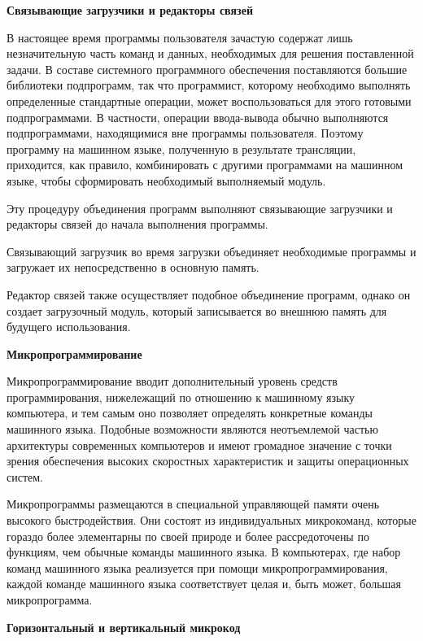 \begin{center}{\bfseries Связывающие загрузчики и редакторы связей}
\end{center}

В настоящее время программы пользователя зачастую содержат лишь незначительную часть команд и данных, необходимых для решения поставленной задачи. В составе системного программного обеспечения поставляются большие библиотеки подпрограмм, так что программист, которому необходимо выполнять определенные стандартные операции, может воспользоваться для этого готовыми подпрограммами. В частности, операции ввода-вывода обычно выполняются подпрограммами, находящимися вне программы пользователя. Поэтому программу на машинном языке, полученную в результате трансляции, приходится, как правило, комбинировать с другими программами на машинном языке, чтобы сформировать необходимый выполняемый модуль.

Эту процедуру объединения программ выполняют связывающие загрузчики и редакторы связей до начала выполнения программы.

Связывающий загрузчик во время загрузки объединяет необходимые программы и загружает их непосредственно в основную память.

Редактор связей также осуществляет подобное объединение программ, однако он создает загрузочный модуль, который записывается во внешнюю память для будущего использования.

\begin{center}{\bfseries Микропрограммирование}
\end{center} 

Микропрограммирование вводит дополнительный уровень средств программирования, нижележащий по отношению к машинному языку компьютера, и тем самым оно позволяет определять конкретные команды машинного языка. Подобные возможности являются неотъемлемой частью архитектуры современных компьютеров и имеют громадное значение с точки зрения обеспечения высоких скоростных характеристик и защиты операционных систем.

Микропрограммы размещаются в специальной управляющей памяти очень высокого быстродействия. Они состоят из индивидуальных микрокоманд, которые гораздо более элементарны по своей природе и более рассредоточены по функциям, чем обычные команды машинного языка. В компьютерах, где набор команд машинного языка реализуется при помощи микропрограммирования, каждой команде машинного языка соответствует целая и, быть может, большая микропрограмма.

\begin{center}{\bfseries Горизонтальный и вертикальный микрокод}
\end{center} 

